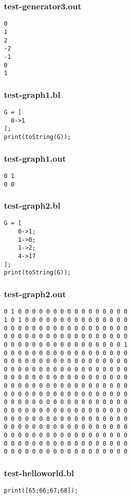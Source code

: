 \subsubsection{test-generator3.out}
\begin{lstlisting}
0
1
2
-2
-1
0
1
\end{lstlisting}
\subsubsection{test-graph1.bl}
\begin{lstlisting}
G = [
  0->1
];
print(toString(G));\end{lstlisting}
\subsubsection{test-graph1.out}
\begin{lstlisting}
0 1
0 0\end{lstlisting}
\subsubsection{test-graph2.bl}
\begin{lstlisting}
G = [
    0->1;
    1->0;
    1->2;
    4->17
];
print(toString(G));\end{lstlisting}
\subsubsection{test-graph2.out}
\begin{lstlisting}
0 1 0 0 0 0 0 0 0 0 0 0 0 0 0 0 0 0
1 0 1 0 0 0 0 0 0 0 0 0 0 0 0 0 0 0
0 0 0 0 0 0 0 0 0 0 0 0 0 0 0 0 0 0
0 0 0 0 0 0 0 0 0 0 0 0 0 0 0 0 0 0
0 0 0 0 0 0 0 0 0 0 0 0 0 0 0 0 0 1
0 0 0 0 0 0 0 0 0 0 0 0 0 0 0 0 0 0
0 0 0 0 0 0 0 0 0 0 0 0 0 0 0 0 0 0
0 0 0 0 0 0 0 0 0 0 0 0 0 0 0 0 0 0
0 0 0 0 0 0 0 0 0 0 0 0 0 0 0 0 0 0
0 0 0 0 0 0 0 0 0 0 0 0 0 0 0 0 0 0
0 0 0 0 0 0 0 0 0 0 0 0 0 0 0 0 0 0
0 0 0 0 0 0 0 0 0 0 0 0 0 0 0 0 0 0
0 0 0 0 0 0 0 0 0 0 0 0 0 0 0 0 0 0
0 0 0 0 0 0 0 0 0 0 0 0 0 0 0 0 0 0
0 0 0 0 0 0 0 0 0 0 0 0 0 0 0 0 0 0
0 0 0 0 0 0 0 0 0 0 0 0 0 0 0 0 0 0
0 0 0 0 0 0 0 0 0 0 0 0 0 0 0 0 0 0
0 0 0 0 0 0 0 0 0 0 0 0 0 0 0 0 0 0
\end{lstlisting}
\subsubsection{test-helloworld.bl}
\begin{lstlisting}
print([65;66;67;68]);
\end{lstlisting}

